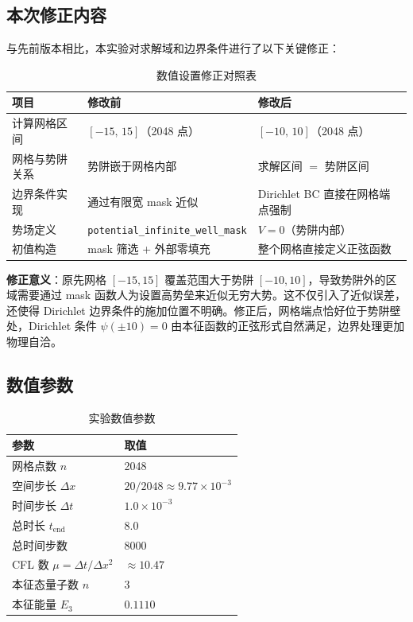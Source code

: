 \documentclass[12pt, a4paper]{article}
\begin{document}
\subsection{本次修正内容}

与先前版本相比，本实验对求解域和边界条件进行了以下关键修正：

\begin{table}[H]
\centering
\caption{数值设置修正对照表}
\begin{tabular}{lll}
\toprule
\textbf{项目} & \textbf{修改前} & \textbf{修改后} \\
\midrule
计算网格区间 & $[-15,\, 15]$（2048 点） & $[-10,\, 10]$（2048 点） \\
网格与势阱关系 & 势阱嵌于网格内部 & 求解区间 $=$ 势阱区间 \\
边界条件实现 & 通过有限宽 mask 近似 & Dirichlet BC 直接在网格端点强制 \\
势场定义 & \texttt{potential\_infinite\_well\_mask} & $V = 0$（势阱内部） \\
初值构造 & mask 筛选 + 外部零填充 & 整个网格直接定义正弦函数 \\
\bottomrule
\end{tabular}
\end{table}

\textbf{修正意义}：原先网格 $[-15, 15]$ 覆盖范围大于势阱 $[-10, 10]$，导致势阱外的区域需要通过 mask 函数人为设置高势垒来近似无穷大势。这不仅引入了近似误差，还使得 Dirichlet 边界条件的施加位置不明确。修正后，网格端点恰好位于势阱壁处，Dirichlet 条件 $\psi(\pm 10) = 0$ 由本征函数的正弦形式自然满足，边界处理更加物理自洽。

\subsection{数值参数}

\begin{table}[H]
\centering
\caption{实验数值参数}
\begin{tabular}{ll}
\toprule
参数 & 取值 \\
\midrule
网格点数 $n$ & 2048 \\
空间步长 $\Delta x$ & $20/2048 \approx 9.77\times 10^{-3}$ \\
时间步长 $\Delta t$ & $1.0\times 10^{-3}$ \\
总时长 $t_{\text{end}}$ & $8.0$ \\
总时间步数 & 8000 \\
CFL 数 $\mu = \Delta t / \Delta x^2$ & $\approx 10.47$ \\
本征态量子数 $n$ & 3 \\
本征能量 $E_3$ & $0.1110$ \\
\bottomrule
\end{tabular}
\end{table}
\end{document}
